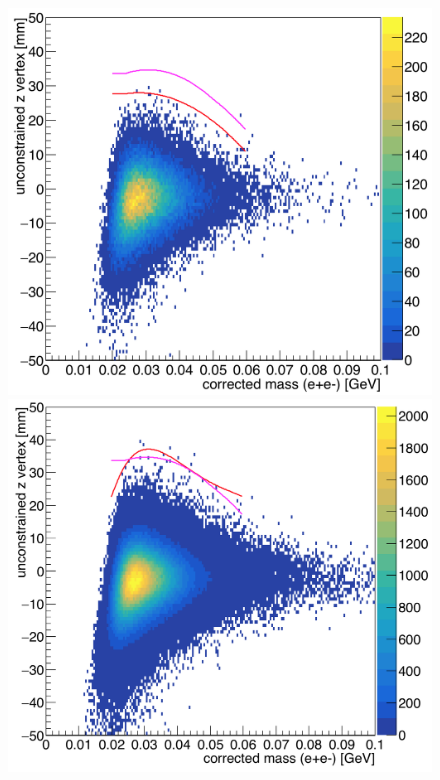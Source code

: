 \begin{figure}[hbt]
\begin{minipage}{0.5\textwidth}
 \includegraphics[width=\textwidth]{pics/appendix/zVm_L1L2_1p5_bl.png}
\end{minipage}\hfill\begin{minipage}{0.5\textwidth}
 \includegraphics[width=\textwidth]{pics/appendix/zVm_L1L2_1p5_ub.png}
 \end{minipage}

\end{figure}
